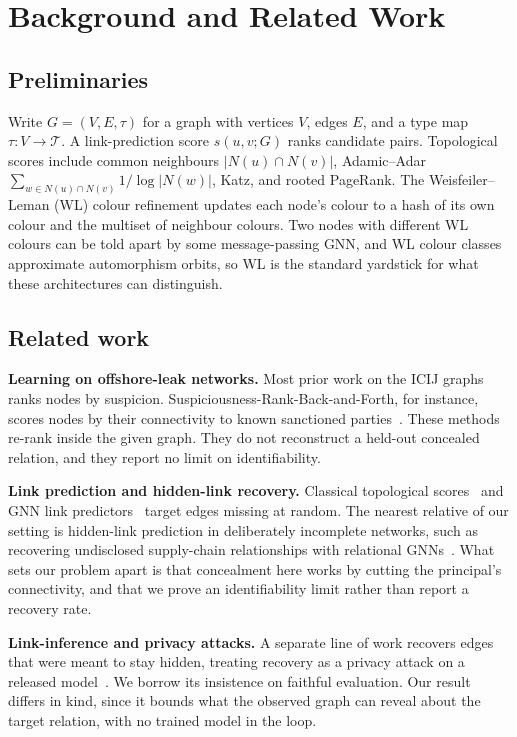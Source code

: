 \documentclass[sigconf]{acmart}
\begin{document}
\section{Background and Related Work}
\subsection{Preliminaries}
Write $G=(V,E,\tau)$ for a graph with vertices $V$, edges $E$, and a type map
$\tau:V\to\mathcal{T}$. A link-prediction score $s(u,v;G)$ ranks candidate pairs.
Topological scores include common neighbours $|N(u)\cap N(v)|$, Adamic--Adar
$\sum_{w\in N(u)\cap N(v)} 1/\log|N(w)|$, Katz, and rooted PageRank. The
Weisfeiler--Leman (WL) colour refinement updates each node's colour to a hash of
its own colour and the multiset of neighbour colours. Two nodes with different WL
colours can be told apart by some message-passing GNN, and WL colour classes
approximate automorphism orbits, so WL is the standard yardstick for what these
architectures can distinguish.

\subsection{Related work}
\textbf{Learning on offshore-leak networks.} Most prior work on the ICIJ graphs
ranks nodes by suspicion. Suspiciousness-Rank-Back-and-Forth, for instance,
scores nodes by their connectivity to known sanctioned parties~\cite{joaristi}.
These methods re-rank inside the given graph. They do not reconstruct a held-out
concealed relation, and they report no limit on identifiability.

\textbf{Link prediction and hidden-link recovery.} Classical topological
scores~\cite{adamicadar,katz} and GNN link predictors~\cite{kipf,sage} target
edges missing at random. The nearest relative of our setting is hidden-link
prediction in deliberately incomplete networks, such as recovering undisclosed
supply-chain relationships with relational GNNs~\cite{supplychain}. What sets our
problem apart is that concealment here works by cutting the principal's
connectivity, and that we prove an identifiability limit rather than report a
recovery rate.

\textbf{Link-inference and privacy attacks.} A separate line of work recovers
edges that were meant to stay hidden, treating recovery as a privacy attack on a
released model~\cite{stealing,linkteller}. We borrow its insistence on faithful
evaluation. Our result differs in kind, since it bounds what the observed graph
can reveal about the target relation, with no trained model in the loop.
\end{document}
